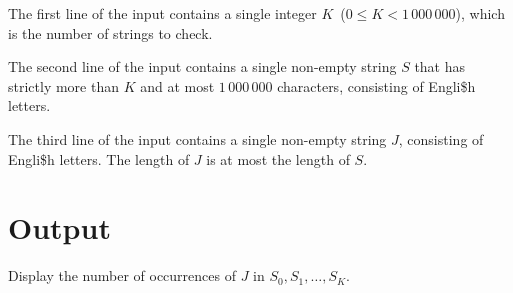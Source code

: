 The first line of the input contains a single integer $K$~($0 \leq K < 1\,000\,000$),
which is the number of strings to check.

The second line of the input contains a single non-empty string $S$ that has strictly more than $K$ and at most $1\,000\,000$ characters, consisting of Engli\$h letters.

The third line of the input contains a single non-empty string $J$, consisting of Engli\$h letters. The length of $J$ is at most the length of $S$.


\section*{Output}

Display the number of occurrences of $J$ in $S_0, S_1, \dots, S_K$.

